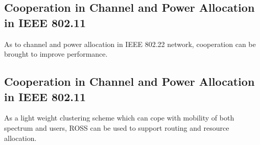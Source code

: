 

%
%
%
%
%
%
%

\subsection*{Cooperation in Channel and Power Allocation in IEEE 802.11}
As to channel and power allocation in IEEE 802.22 network, cooperation can be brought to improve performance. 

\subsection*{Cooperation in Channel and Power Allocation in IEEE 802.11}
As a light weight clustering scheme which can cope with mobility of both spectrum and users, ROSS can be used to support routing and resource allocation.



